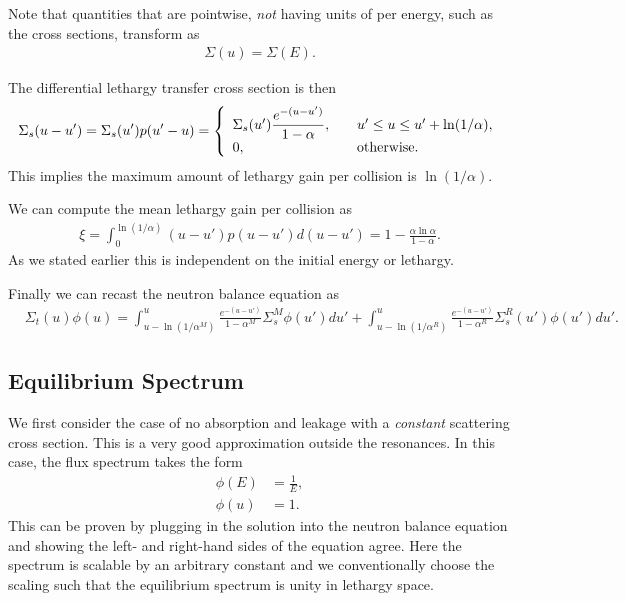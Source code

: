Note that quantities that are pointwise, \emph{not} having units of per energy, such as the cross sections, transform as
\begin{align}
  \Sigma(u) = \Sigma(E) .
\end{align}

The differential lethargy transfer cross section is then
\begin{align}
  \Sigma_s( u - u' ) = \Sigma_s(u') p(u' - u) = \left\{ \begin{array}{l l}
  \Sigma_s(u') \dfrac{e^{-(u - u')}}{ 1 - \alpha } , & \quad u' \le u \le u' + \ln(1/\alpha), \\
  0, & \quad \text{otherwise}. \\ \end{array} \right.
\end{align}
This implies the maximum amount of lethargy gain per collision is $\ln(1/\alpha)$.

We can compute the mean lethargy gain per collision as
\begin{align}
  \xi = \int_0^{\ln(1/\alpha)} (u - u') p(u - u') d(u - u') = 1 - \frac{ \alpha \ln\alpha }{ 1 - \alpha } .
\end{align}
As we stated earlier this is independent on the initial energy or lethargy.

Finally we can recast the neutron balance equation as
\begin{align}
  &\Sigma_t(u) \phi(u)  
  = \int_{u-\ln(1/\alpha^M)}^u  \frac{ e^{-(u - u')} }{ 1 - \alpha^M } \Sigma_s^M \phi(u') du'
  + \int_{u-\ln(1/\alpha^R)}^u  \frac{ e^{-(u - u')} }{ 1 - \alpha^R } \Sigma_s^R(u') \phi(u') du' .
\end{align}

\subsection{Equilibrium Spectrum}

We first consider the case of no absorption and leakage with a \emph{constant} scattering cross section. This is a very good approximation outside the resonances. In this case, the flux spectrum takes the form
\begin{subequations}
\begin{align}
  \phi(E) &= \frac{1}{E} , \\
  \phi(u) &= 1.
\end{align}
\end{subequations}
This can be proven by plugging in the solution into the neutron balance equation and showing the left- and right-hand sides of the equation agree. Here the spectrum is scalable by an arbitrary constant and we conventionally choose the scaling such that the equilibrium spectrum is unity in lethargy space.


